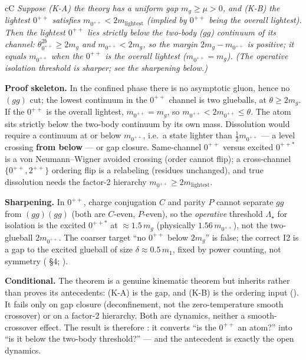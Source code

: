 \begin{claimbox}{cC}
 \emph{Suppose (K-A) the theory has a uniform gap
$m_g\ge\mu>0$, and (K-B) the lightest $0^{++}$ satisfies $m_{0^{++}}<2m_{\mathrm{lightest}}$
(implied by $0^{++}$ being the overall lightest). Then the lightest $0^{++}$ lies strictly below
the two-body ($gg$) continuum of its channel: $\theta^{2b}_{0^{++}}\ge2m_g$ and
$m_{0^{++}}<2m_g$, so the margin $2m_g-m_{0^{++}}$ is positive; it equals $m_{0^{++}}$ when the
$0^{++}$ is the overall lightest ($m_{0^{++}}=m_g$). (The operative isolation threshold is
sharper; see the sharpening below.)}

\smallskip
\textbf{Proof skeleton.} In the confined phase there is no asymptotic gluon, hence no $(gg)$
cut; the lowest continuum in the $0^{++}$ channel is two glueballs, at $\theta\ge2m_g$. If the
$0^{++}$ is the overall lightest, $m_{0^{++}}=m_g$, so $m_{0^{++}}<2m_{0^{++}}\le\theta$. The
atom sits strictly below the two-body continuum by its own mass. Dissolution would require a continuum
at or below $m_{0^{++}}$, i.e.\ a state lighter than $\tfrac12m_{0^{++}}$ --- a level crossing
\textbf{from below} --- or gap closure. Same-channel $0^{++}$ versus excited $0^{++*}$ is a von
Neumann--Wigner avoided crossing (order cannot flip); a cross-channel $\{0^{++},2^{++}\}$
ordering flip is a relabeling (residues unchanged), and true dissolution needs the factor-2
hierarchy $m_{0^{++}}\ge2m_{\mathrm{lightest}}$.

\smallskip
\textbf{Sharpening.} In $0^{++}$, charge conjugation $C$ and parity $P$ cannot separate $gg$
from $(gg)(gg)$ (both are $C$-even, $P$-even), so the \emph{operative} threshold $\Lambda_{\star}$ for
isolation is the excited $0^{++*}$ at $\approx1.5\,m_g$ (physically $1.56\,m_{0^{++}}$), not the
two-glueball $2m_{0^{++}}$. The coarser target ``no $0^{++}$ below $2m_g$'' is false; the correct
I2 is a gap to the excited glueball of size $\delta\approx0.5\,m_1$, fixed by power counting, not
symmetry ( \S4; ).

\smallskip
\textbf{Conditional.} The theorem is a genuine kinematic theorem but inherits rather than proves
its antecedents: (K-A) is the gap, and (K-B) is the ordering input (). It fails only
on gap closure (deconfinement, not the zero-temperature smooth crossover) or on a factor-2
hierarchy. Both are dynamics, neither a smooth-crossover effect. The result is therefore \LC: it
converts ``is the $0^{++}$ an atom?'' into ``is it below the two-body threshold?'' --- and the
antecedent is exactly the open dynamics.
\end{claimbox}

